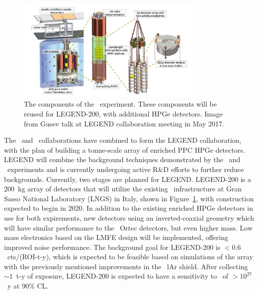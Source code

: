 \documentclass[/main.tex]{subfiles}
\begin{document}
\begin{figure}
  \centering
  \includegraphics[width=0.8\textwidth]{legend200}
  \caption[\Gerda\ experimental design]{\label{fig:legend200}
    The components of the \Gerda\ experiment. These components will be reused for LEGEND-200, with additional HPGe detectors. Image from Gusev talk at LEGEND collaboration meeting in May 2017.
  }
\end{figure}
The \MJ\ and \Gerda\ collaborations have combined to form the LEGEND collaboration, with the plan of building a tonne-scale array of enriched PPC HPGe detectors\cite{legend}.
LEGEND will combine the background techniques demonstrated by the \MJD\ and \Gerda\ experiments and is currently undergoing active R\&D efforts to further reduce backgrounds.
Currently, two stages are planned for LEGEND.
LEGEND-200 is a 200~kg array of detectors that will utilize the existing \Gerda\ infrastructure at Gran Sasso National Laboratory (LNGS) in Italy, shown in Figure~\ref{fig:legend200}, with construction expected to begin in 2020.
In addition to the existing enriched HPGe detectors in use for both expirements, new detectors using an inverted-coaxial geometry which will have similar performance to the \MJD\ Ortec detectors, but even higher mass.
Low mass electronics based on the LMFE design will be implemented, offering improved noise performance.
The background goal for LEGEND-200 is $<0.6$~cts/(ROI-t-y), which is expected to be feasible based on simulations of the array with the previously mentioned improvements in the \Gerda\ lAr shield.
After collecting $\sim1$~t-y of exposure, LEGEND-200 is expected to have a sensitivity to  \znbb\ of $>10^{27}$~y at 90\% CL.
\end{document}

